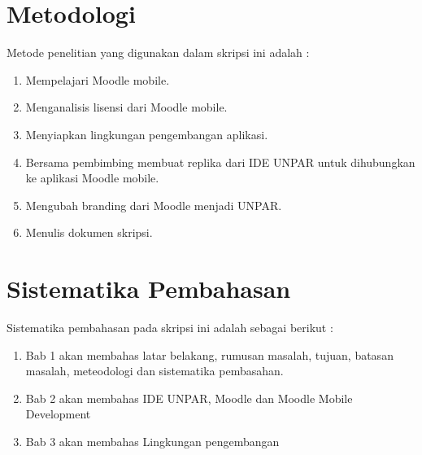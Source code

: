 \section{Metodologi}
\label{sec:metlit}
Metode penelitian yang digunakan dalam skripsi ini adalah :
\begin{enumerate}
		\item Mempelajari Moodle mobile.
		\item Menganalisis lisensi dari Moodle mobile.
		\item Menyiapkan lingkungan pengembangan aplikasi.
		\item Bersama pembimbing membuat replika dari IDE UNPAR untuk dihubungkan ke aplikasi Moodle mobile.
		\item Mengubah branding dari Moodle menjadi UNPAR.
		\item Menulis dokumen skripsi.
\end{enumerate}

\section{Sistematika Pembahasan}
\label{sec:sispem}
 Sistematika pembahasan pada skripsi ini adalah sebagai berikut :
 \begin{enumerate}
 	\item Bab 1 akan membahas latar belakang, rumusan masalah, tujuan, batasan masalah, meteodologi dan sistematika pembasahan.
 	\item Bab 2 akan membahas IDE UNPAR, Moodle dan Moodle Mobile Development
	\item Bab 3 akan membahas Lingkungan pengembangan
 \end{enumerate}